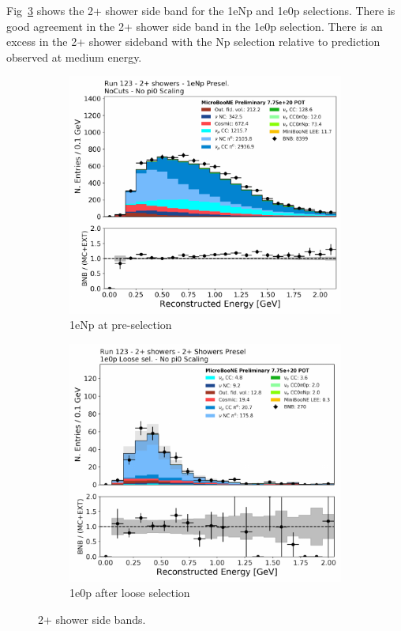 Fig~\ref{fig:fakedata:set4:2shr} shows the 2+ shower side band for the 1eNp and 1e0p selections. There is good agreement in the 2+ shower side band in the 1e0p selection.  There is an excess in the 2+ shower sideband with the Np selection relative to prediction observed at medium energy.  

\begin{figure}[H] 
\begin{center}
    \begin{subfigure}[b]{0.45\textwidth}
    \centering
    \includegraphics[width=1.00\textwidth]{Fakedata/set4/np_2shr.pdf}
    \caption{\label{fig:fakedata:set4:2shrnp} 1eNp at pre-selection}
    \end{subfigure}
    \begin{subfigure}[b]{0.45\textwidth}
    \centering
    \includegraphics[width=1.00\textwidth]{Fakedata/set4/zp_2shr.pdf}
    \caption{\label{fig:fakedata:set4:2shr0p} 1e0p after loose selection}
    \end{subfigure}
\caption{\label{fig:fakedata:set4:2shr} 2+ shower side bands.}
\end{center}
\end{figure}

